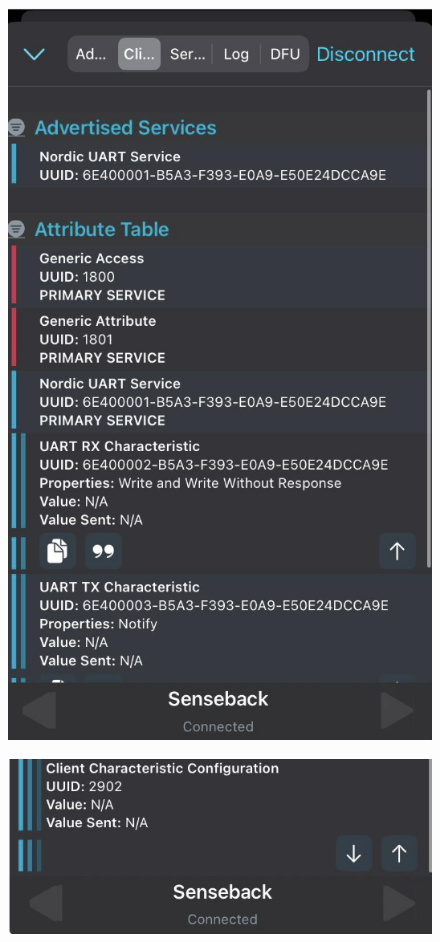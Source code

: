 \documentclass{Configuration_Files/PoliMi3i_thesis}
\begin{document}
\begin{figure}[H]
    \centering
    \includegraphics[scale=0.3]{Multicentral/11.png}
    \label{fig:nrf_connect_commands}
\end{figure}

\begin{figure}[H]
    \centering
    \includegraphics[scale=0.3]{Multicentral/12.png}
    \label{fig:nrf_connect_commands}
\end{figure}
\end{document}
